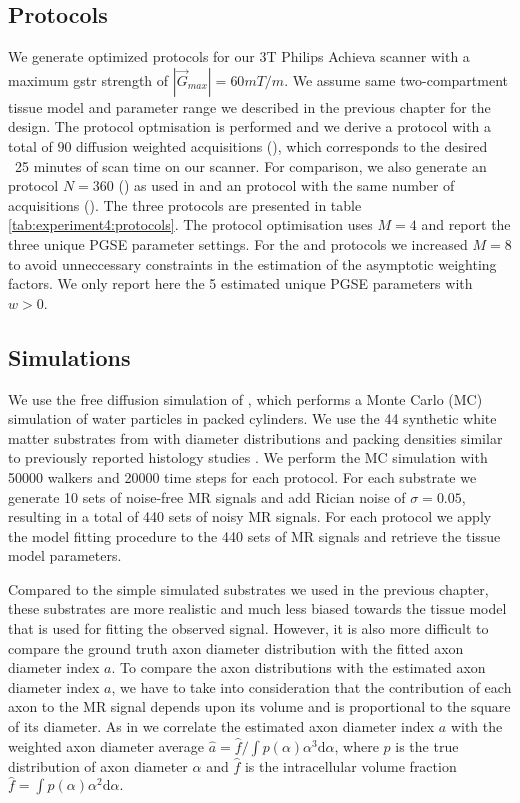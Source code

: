 \subsection{Protocols}
We generate optimized protocols for our 3T Philips Achieva scanner with a maximum {\gls{gstr}} strength of $|\vec{G}_{max}|=60mT/m$. We assume same two-compartment tissue model and parameter range we described in the previous chapter for the \SFasym{} design. The \SFasym protocol optmisation is performed and we derive a protocol with a total of $90$ diffusion weighted acquisitions (\SFshort), which corresponds to the desired ~25 minutes of scan time on our scanner. For comparison, we also generate an \OI protocol $N=360$ (\OIlong) as used in \citep{Alexander:2010} and an \SFasym protocol with the same number of acquisitions (\SFlong). The three protocols are presented in table \ref{tab:experiment4:protocols}. The \OIlong{} protocol optimisation uses $M=4$ and report the three unique {\gls{PGSE}} parameter settings. For the \SFshort{} and \SFlong{} protocols we increased $M=8$ to avoid unneccessary constraints in the estimation of the asymptotic weighting factors. We only report here the 5 estimated unique PGSE parameters with $w>0$.
\subsection{Simulations}
We use the free diffusion simulation of \citet{Hall:2009}, which performs a Monte Carlo (MC) simulation of water particles in packed cylinders. We use the 44 synthetic white matter substrates from \citet{Alexander:2010} with diameter distributions and packing densities similar to previously reported histology studies \citep{GrafvonKeyserlingk:1984,LaMantia:1990,Aboitiz:1992}.%
We perform the MC simulation with 50000 walkers and 20000 time steps for each protocol. For each substrate we generate 10 sets of noise-free MR signals and add Rician noise of $\sigma=0.05$, resulting in a total of 440 sets of noisy MR signals. For each protocol we apply the model fitting procedure to the 440 sets of MR signals and retrieve the tissue model parameters.

Compared to the simple simulated substrates we used in the previous chapter, these substrates are more realistic and much less biased towards the tissue model that is used for fitting the observed signal. However, it is also more difficult to compare the ground truth axon diameter distribution with the fitted axon diameter index $a$. To compare the axon distributions with the estimated axon diameter index $a$, we have to take into consideration that the contribution of each axon to the MR signal depends upon its volume and is proportional to the square of its diameter. As in \citet{Alexander:2010} we correlate the estimated axon diameter index $a$ with the weighted axon diameter average $\hat{a} = \hat{f} / \int p(\alpha)\alpha^3\mbox{d}\alpha$, where $p$ is the true distribution of axon diameter $\alpha$ and $\hat{f}$ is the intracellular volume fraction $\hat{f} = \int p(\alpha)\alpha^2\mbox{d}\alpha.$

